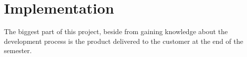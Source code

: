 \chapter{Implementation}

The biggest part of this project, beside from gaining knowledge about the development process is the product delivered to the customer at the end of the semester.

